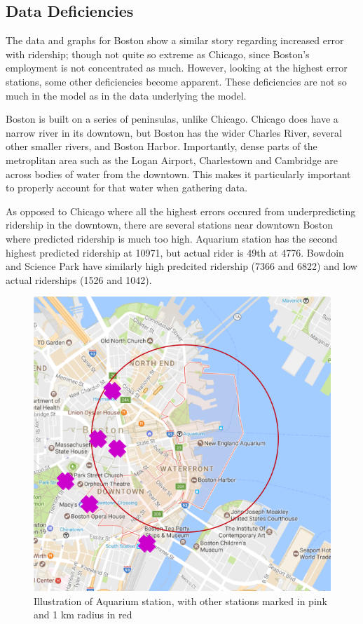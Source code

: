 \documentclass{article}
\begin{document}
\subsection{Data Deficiencies}
The data and graphs for Boston show a similar story regarding increased error with ridership; though not quite so extreme as Chicago, since Boston's employment is not concentrated as much. However, looking at the highest error stations, some other deficiencies become apparent. These deficiencies are not so much in the model as in the data underlying the model.

Boston is built on a series of peninsulas, unlike Chicago. Chicago does have a narrow river in its downtown, but Boston has the wider Charles River, several other smaller rivers, and Boston Harbor. Importantly, dense parts of the metroplitan area such as the Logan Airport, Charlestown and Cambridge are across bodies of water from the downtown. This makes it particularly important to properly account for that water when gathering data. 

As opposed to Chicago where all the highest errors occured from underpredicting ridership in the downtown, there are several stations near downtown Boston where predicted ridership is much too high. Aquarium station has the second highest predicted ridership at 10971, but actual rider is 49th at 4776. Bowdoin and Science Park have similarly high predcited ridership (7366 and 6822) and low actual riderships (1526 and 1042). 

\begin{figure}[H]\label{fig:f9}
\begin{center}\includegraphics[scale=0.6]{Aquarium_with_markup}\end{center}
\caption{Illustration of Aquarium station, with other stations marked in pink and 1 km radius in red}
\end{figure}
\end{document}
